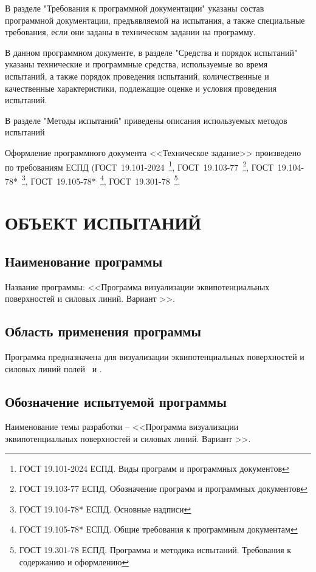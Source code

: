 \documentclass[14pt,a4paper,final]{extreport}
\begin{document}
В разделе "Требования к программной документации" указаны состав
программной документации, предъявляемой на испытания, а также специальные требования, если они заданы в техническом задании на программу.

В данном программном документе, в разделе "Средства и порядок испытаний" указаны технические и программные средства, используемые во время испытаний, а также порядок проведения испытаний, количественные и качественные
характеристики, подлежащие оценке и условия проведения испытаний.

В разделе "Методы испытаний" приведены описания используемых методов
испытаний

Оформление программного документа <<Техническое задание>> произведено по требованиям ЕСПД (ГОСТ~19.101-2024~\footnote{ГОСТ 19.101-2024 ЕСПД. Виды программ и программных документов}, 
ГОСТ~19.103-77~\footnote{ГОСТ 19.103-77 ЕСПД. Обозначение программ и программных документов}, 
ГОСТ~19.104-78*~\footnote{ГОСТ 19.104-78* ЕСПД. Основные надписи}, 
ГОСТ~19.105-78*~\footnote{ГОСТ 19.105-78* ЕСПД. Общие требования к программным документам},
ГОСТ~19.301-78~\footnote{ГОСТ 19.301-78 ЕСПД. Программа и методика испытаний. Требования к содержанию и оформлению}.

\pagebreak


\tableofcontents

\pagebreak

\chapter{ ОБЪЕКТ ИСПЫТАНИЙ}
\section{Наименование программы}
Название программы: <<Программа визуализации эквипотенциальных поверхностей и силовых линий. Вариант \variant>>.

\section{Область применения программы}
Программа предназначена для визуализации эквипотенциальных поверхностей и силовых линий полей \fieldA\ и \fieldB.

\section{Обозначение испытуемой программы}
Наименование темы разработки -- <<Программа визуализации эквипотенциальных поверхностей и силовых линий. Вариант \variant>>.
\end{document}
